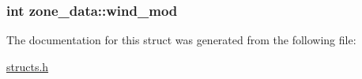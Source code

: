 \hypertarget{structzone__data_a33f2397ced886d2f2df2a8e3b3f36cf1}{
\subsubsection[{wind\-\_\-mod}]{\setlength{\rightskip}{0pt plus 5cm}int zone\-\_\-data\-::wind\-\_\-mod}}\label{structzone__data_a33f2397ced886d2f2df2a8e3b3f36cf1}


The documentation for this struct was generated from the following file\-:\begin{DoxyCompactItemize}
\item 
\hyperlink{structs_8h}{structs.\-h}\end{DoxyCompactItemize}
